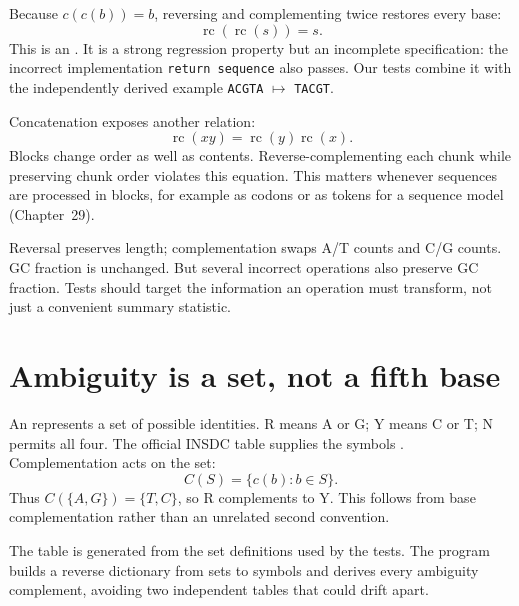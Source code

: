 Because $c(c(b))=b$, reversing and complementing twice restores every base:
\begin{equation}
\operatorname{rc}(\operatorname{rc}(s))=s.
\label{eq:involution}
\end{equation}
This is an . It is a strong regression property but an
incomplete specification: the incorrect implementation
\texttt{return sequence} also passes. Our tests combine it with the
independently derived example \texttt{ACGTA} $\mapsto$ \texttt{TACGT}.

Concatenation exposes another relation:
\begin{equation}
\operatorname{rc}(xy)=\operatorname{rc}(y)\operatorname{rc}(x).
\label{eq:concat}
\end{equation}
Blocks change order as well as contents. Reverse-complementing each chunk
while preserving chunk order violates this equation. This matters whenever
sequences are processed in blocks, for example as codons or as tokens for a
sequence model (Chapter~29).

Reversal preserves length; complementation swaps A/T counts and C/G counts.
GC fraction is unchanged. But several incorrect operations also preserve
GC fraction. Tests should target the information an operation must transform,
not just a convenient summary statistic.

\section{Ambiguity is a set, not a fifth base}
\label{sec:ambiguity}

An  represents a set of possible identities.
R means A or G; Y means C or T; N permits all four. The official INSDC
table supplies the symbols \cite{INSDC}. Complementation acts on the set:
\begin{equation}
C(S)=\{c(b):b\in S\}.
\end{equation}
Thus $C(\{A,G\})=\{T,C\}$, so R complements to Y. This follows from base
complementation rather than an unrelated second convention.

\begin{center}\end{center}

The table is generated from the set definitions used by the tests. The
program builds a reverse dictionary from sets to symbols and derives every
ambiguity complement, avoiding two independent tables that could drift apart.

